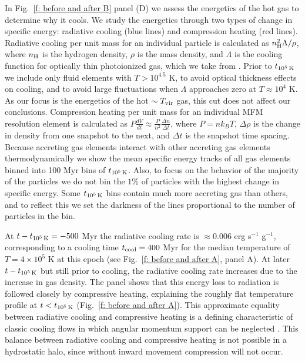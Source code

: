 \documentclass[fleqn,usenatbib]{mnras}
\newcommand{\tcools}{t_{10^5\,{\rm K}}}
\newcommand{\nH}{n_{\rm H}}
\newcommand{\Tvir}{T_{\rm vir}}
\begin{document}
In Fig.~\ref{f: before and after B} panel (D) we assess the energetics of the hot gas to determine why it cools.
We study the energetics through two types of change in specific energy: radiative cooling (blue lines) and compression heating (red lines).
Radiative cooling per unit mass for an individual particle is calculated as $\nH^2 \Lambda / \rho$, where $\nH$ is the hydrogen density, $\rho$ is the mass density, and $\Lambda$ is the cooling function for optically thin photoionized gas, which we take from \cite{Wiersma2009a}.
Prior to $\tcools$ we include only fluid elements with $T>10^{4.5}$ K, to avoid optical thickness effects on cooling, and to avoid large fluctuations when $\Lambda$ approaches zero at $T\approx10^4$ K.
As our focus is the energetics of the hot $\sim\Tvir$ gas, this cut does not affect our conclusions. 
Compression heating per unit mass for an individual MFM resolution element is calculated as $P \frac{dV}{dt} \approx \frac{ P }{ n^2 } \frac{ \Delta n }{ \Delta t }$, where $P = n k_B T$, $\Delta \rho$ is the change in density from one snapshot to the next, and $\Delta t$ is the snapshot time spacing.
Because accreting gas elements interact with other accreting gas elements thermodynamically we show the mean specific energy tracks of all gas elements binned into 100 Myr bins of $\tcools$. 
Also, to focus on the behavior of the majority of the particles we do not bin the $1\%$ of particles with the highest change in specific energy.
Some $\tcools$ bins contain much more accreting gas than others, and to reflect this we set the darkness of the lines proportional to the number of particles in the bin.

At $t-\tcools=-500$ Myr the radiative cooling rate is $\approx0.006$ erg s$^{-1}$ g$^{-1}$, corresponding to a cooling time $t_{\rm cool}=400$ Myr for the median temperature of $T=4\times 10^5$ K at this epoch (see Fig.~\ref{f: before and after A}, panel A). 
At later $t-\tcools$ but still prior to cooling, the radiative cooling rate increases due to the increase in gas density.
The panel shows that this energy loss to radiation is followed closely by compressive heating, explaining the roughly flat temperature profile at $t<\tcools$ (Fig.~\ref{f: before and after A}). 
This approximate equality between radiative cooling and compressive heating is a defining characteristic of classic cooling flows in which angular momentum support can be neglected \citep{Mathews1978, McNamara2007, Stern2019}. 
This balance between radiative cooling and compressive heating is not possible in a hydrostatic halo, since without inward movement compression will not occur.
\end{document}
